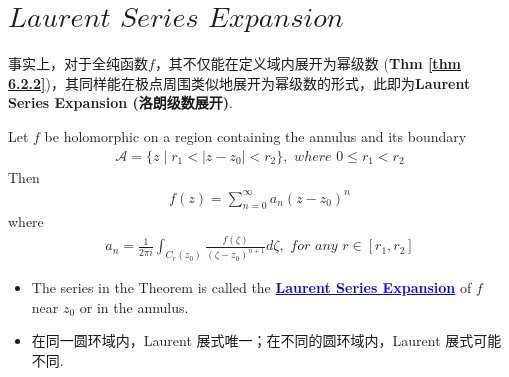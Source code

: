 \newpage
\section{$Laurent \,\, Series \,\, Expansion$}
	事实上，对于全纯函数$f$，其不仅能在定义域内展开为幂级数 (\textbf{Thm \ref{thm 6.2.2}})，其同样能在极点周围类似地展开为幂级数的形式，此即为\textbf{Laurent Series Expansion (洛朗级数展开)}.
	
	\begin{thm}
		Let $f$ be holomorphic on a region containing the annulus and its boundary
		\begin{align}
			\mathcal{A} = \{ z \mid r_1 < \left| z - z_0 \right| < r_2 \}, \,\, where \,\, 0 \leq r_1 < r_2
		\end{align}
		Then
		\begin{align}
			f(z) = \sum_{n = 0}^{\infty}{a_n (z - z_0)^n}
		\end{align}
		where
		\begin{align}
			a_n = \frac{1}{2\pi i} \int_{C_{r}(z_0)}{\frac{f(\zeta)}{(\zeta - z_0)^{n + 1}} d\zeta} , \,\, for \,\, any \,\, r \in [r_1 , r_2]
		\end{align}
	
		\vspace{1em}
		\begin{rmk}
			\begin{itemize}
				\item The series in the Theorem is called the \underline{\textcolor{blue}{\textbf{Laurent Series Expansion}}} of $f$ near $z_0$ or in the annulus.
				
				\vspace{1em}
				
				\item 在同一圆环域内，Laurent 展式唯一；在不同的圆环域内，Laurent 展式可能不同.
			\end{itemize}
		\end{rmk}
	

\end{thm}
